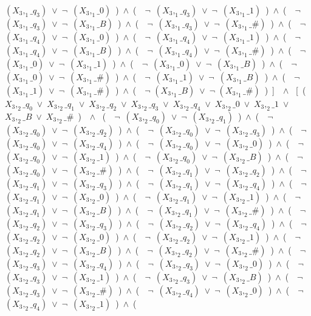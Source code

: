 ﻿\documentclass[a4paper,10pt]{article}
\begin{document}
$(X_3,_1\_q_3)$\ $\vee$\ $\neg$\ $(X_3,_1\_0)$\ )\ $\wedge$\ (\ \ $\neg$\ $(X_3,_1\_q_3)$\ $\vee$\ $\neg$\ $(X_3,_1\_1)$\ )\ $\wedge$\ (\ \ $\neg$\ $(X_3,_1\_q_3)$\ $\vee$\ $\neg$\ $(X_3,_1\_B)$\ )\ $\wedge$\ (\ \ $\neg$\ $(X_3,_1\_q_3)$\ $\vee$\ $\neg$\ $(X_3,_1\_\#)$\ )\ $\wedge$\ (\ \ $\neg$\ $(X_3,_1\_q_4)$\ $\vee$\ $\neg$\ $(X_3,_1\_0)$\ )\ $\wedge$\ (\ \ $\neg$\ $(X_3,_1\_q_4)$\ $\vee$\ $\neg$\ $(X_3,_1\_1)$\ )\ $\wedge$\ (\ \ $\neg$\ $(X_3,_1\_q_4)$\ $\vee$\ $\neg$\ $(X_3,_1\_B)$\ )\ $\wedge$\ (\ \ $\neg$\ $(X_3,_1\_q_4)$\ $\vee$\ $\neg$\ $(X_3,_1\_\#)$\ )\ $\wedge$\ (\ \ $\neg$\ $(X_3,_1\_0)$\ $\vee$\ $\neg$\ $(X_3,_1\_1)$\ )\ $\wedge$\ (\ \ $\neg$\ $(X_3,_1\_0)$\ $\vee$\ $\neg$\ $(X_3,_1\_B)$\ )\ $\wedge$\ (\ \ $\neg$\ $(X_3,_1\_0)$\ $\vee$\ $\neg$\ $(X_3,_1\_\#)$\ )\ $\wedge$\ (\ \ $\neg$\ $(X_3,_1\_1)$\ $\vee$\ $\neg$\ $(X_3,_1\_B)$\ )\ $\wedge$\ (\ \ $\neg$\ $(X_3,_1\_1)$\ $\vee$\ $\neg$\ $(X_3,_1\_\#)$\ )\ $\wedge$\ (\ \ $\neg$ $(X_3,_1\_B)$\ $\vee$\ $\neg$ $(X_3,_1\_\#)$\ )\ ]\ \ $\wedge$ \ [\ (\ $X_3,_2\_q_0$\ $\vee$\ $X_3,_2\_q_1$\ $\vee$\ $X_3,_2\_q_2$\ $\vee$\ $X_3,_2\_q_3$\ $\vee$\ $X_3,_2\_q_4$\ $\vee$\ $X_3,_2\_0$\ $\vee$\ $X_3,_2\_1$\ $\vee$\ $X_3,_2\_B$\ $\vee$\ $X_3,_2\_\#$\ )\ \ $\wedge$ \ (\ \ $\neg$\ $(X_3,_2\_q_0)$\ $\vee$\ $\neg$\ $(X_3,_2\_q_1)$\ )\ $\wedge$\ (\ \ $\neg$\ $(X_3,_2\_q_0)$\ $\vee$\ $\neg$\ $(X_3,_2\_q_2)$\ )\ $\wedge$\ (\ \ $\neg$\ $(X_3,_2\_q_0)$\ $\vee$\ $\neg$\ $(X_3,_2\_q_3)$\ )\ $\wedge$\ (\ \ $\neg$\ $(X_3,_2\_q_0)$\ $\vee$\ $\neg$\ $(X_3,_2\_q_4)$\ )\ $\wedge$\ (\ \ $\neg$\ $(X_3,_2\_q_0)$\ $\vee$\ $\neg$\ $(X_3,_2\_0)$\ )\ $\wedge$\ (\ \ $\neg$\ $(X_3,_2\_q_0)$\ $\vee$\ $\neg$\ $(X_3,_2\_1)$\ )\ $\wedge$\ (\ \ $\neg$\ $(X_3,_2\_q_0)$\ $\vee$\ $\neg$\ $(X_3,_2\_B)$\ )\ $\wedge$\ (\ \ $\neg$\ $(X_3,_2\_q_0)$\ $\vee$\ $\neg$\ $(X_3,_2\_\#)$\ )\ $\wedge$\ (\ \ $\neg$\ $(X_3,_2\_q_1)$\ $\vee$\ $\neg$\ $(X_3,_2\_q_2)$\ )\ $\wedge$\ (\ \ $\neg$\ $(X_3,_2\_q_1)$\ $\vee$\ $\neg$\ $(X_3,_2\_q_3)$\ )\ $\wedge$\ (\ \ $\neg$\ $(X_3,_2\_q_1)$\ $\vee$\ $\neg$\ $(X_3,_2\_q_4)$\ )\ $\wedge$\ (\ \ $\neg$\ $(X_3,_2\_q_1)$\ $\vee$\ $\neg$\ $(X_3,_2\_0)$\ )\ $\wedge$\ (\ \ $\neg$\ $(X_3,_2\_q_1)$\ $\vee$\ $\neg$\ $(X_3,_2\_1)$\ )\ $\wedge$\ (\ \ $\neg$\ $(X_3,_2\_q_1)$\ $\vee$\ $\neg$\ $(X_3,_2\_B)$\ )\ $\wedge$\ (\ \ $\neg$\ $(X_3,_2\_q_1)$\ $\vee$\ $\neg$\ $(X_3,_2\_\#)$\ )\ $\wedge$\ (\ \ $\neg$\ $(X_3,_2\_q_2)$\ $\vee$\ $\neg$\ $(X_3,_2\_q_3)$\ )\ $\wedge$\ (\ \ $\neg$\ $(X_3,_2\_q_2)$\ $\vee$\ $\neg$\ $(X_3,_2\_q_4)$\ )\ $\wedge$\ (\ \ $\neg$\ $(X_3,_2\_q_2)$\ $\vee$\ $\neg$\ $(X_3,_2\_0)$\ )\ $\wedge$\ (\ \ $\neg$\ $(X_3,_2\_q_2)$\ $\vee$\ $\neg$\ $(X_3,_2\_1)$\ )\ $\wedge$\ (\ \ $\neg$\ $(X_3,_2\_q_2)$\ $\vee$\ $\neg$\ $(X_3,_2\_B)$\ )\ $\wedge$\ (\ \ $\neg$\ $(X_3,_2\_q_2)$\ $\vee$\ $\neg$\ $(X_3,_2\_\#)$\ )\ $\wedge$\ (\ \ $\neg$\ $(X_3,_2\_q_3)$\ $\vee$\ $\neg$\ $(X_3,_2\_q_4)$\ )\ $\wedge$\ (\ \ $\neg$\ $(X_3,_2\_q_3)$\ $\vee$\ $\neg$\ $(X_3,_2\_0)$\ )\ $\wedge$\ (\ \ $\neg$\ $(X_3,_2\_q_3)$\ $\vee$\ $\neg$\ $(X_3,_2\_1)$\ )\ $\wedge$\ (\ \ $\neg$\ $(X_3,_2\_q_3)$\ $\vee$\ $\neg$\ $(X_3,_2\_B)$\ )\ $\wedge$\ (\ \ $\neg$\ $(X_3,_2\_q_3)$\ $\vee$\ $\neg$\ $(X_3,_2\_\#)$\ )\ $\wedge$\ (\ \ $\neg$\ $(X_3,_2\_q_4)$\ $\vee$\ $\neg$\ $(X_3,_2\_0)$\ )\ $\wedge$\ (\ \ $\neg$\ $(X_3,_2\_q_4)$\ $\vee$\ $\neg$\ $(X_3,_2\_1)$\ )\ $\wedge$\ (\ \ 
\end{document}
